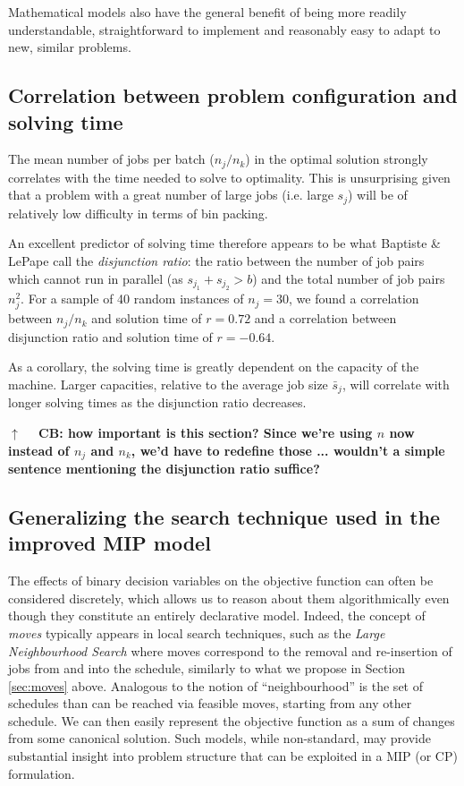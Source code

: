 \documentclass[oribibl]{llncs}
\begin{document}
Mathematical models also have the general benefit of being more readily
understandable, straightforward to implement and reasonably easy to
adapt to new, similar problems.

\subsection{Correlation between problem configuration and solving time}
\label{sec:correlation}
The mean number of jobs per batch ($n_j/n_k$) in the optimal solution
strongly correlates with the time needed to solve to optimality. This
is unsurprising given that a problem with a great number of large jobs
(i.e. large $s_j$) will be of relatively low difficulty in terms of bin
packing. 

An excellent predictor of solving time therefore appears to be what Baptiste \& LePape
\cite{baptistelepape} call the \textit{disjunction ratio}: the ratio between the
number of job pairs which cannot run in parallel (as $s_{j_1} + s_{j_2} > b$) and
the total number of job pairs $n_j^2$. For a sample of 40 random instances of
$n_j=30$, we found a correlation between $n_j/n_k$ and solution time of $r =
0.72$ and a correlation between disjunction ratio and solution time of $r =
-0.64$.

As a corollary, the solving time is greatly dependent on the
capacity of the machine. Larger capacities, relative to the average job size
$\bar{s}_j$, will correlate with longer solving times as the disjunction ratio decreases.

\textbf{$\uparrow \quad$ CB: how important is this section? Since we're using $n$
now instead of $n_j$ and $n_k$, we'd have to redefine those ... wouldn't a
simple sentence mentioning the disjunction ratio suffice?}

\subsection{Generalizing the search technique used in the improved MIP model}

The effects of binary decision variables on the objective function can often be
considered discretely, which allows us to reason about them algorithmically
even though they constitute an entirely declarative model.
Indeed, the concept of \textit{moves} typically appears
in local search techniques, such as the \textit{Large Neighbourhood
Search} \cite{shaw} where moves correspond to the removal and
re-insertion of jobs from and into the schedule, similarly to what
we propose in Section \ref{sec:moves} above. Analogous to the notion
of ``neighbourhood'' is the set of schedules than can be reached via
feasible moves, starting from any other schedule. We can then easily
represent the objective function as a sum of changes from
some canonical solution. Such models, while non-standard, may provide
substantial insight into problem structure that can be exploited in a
MIP (or CP) formulation.
\end{document}
